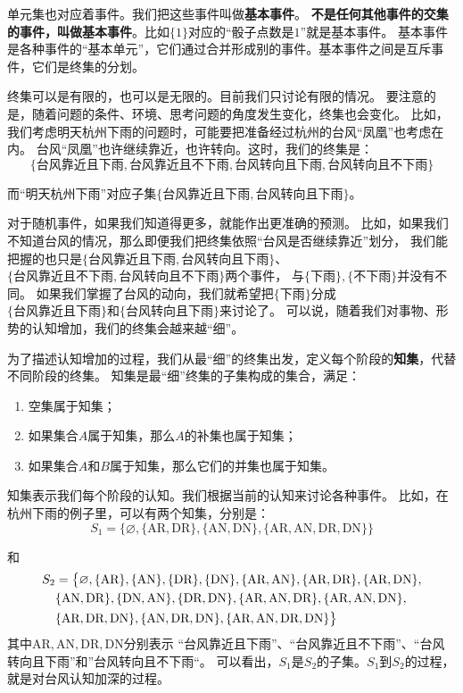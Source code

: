 \documentclass[12pt,UTF8]{ctexbook}
\begin{document}
单元集也对应着事件。我们把这些事件叫做\textbf{基本事件}。
\textbf{不是任何其他事件的交集的事件，叫做基本事件}。比如$\{1\}$对应的“骰子点数是$1$”就是基本事件。
基本事件是各种事件的“基本单元”，它们通过合并形成别的事件。基本事件之间是互斥事件，它们是终集的分划。

终集可以是有限的，也可以是无限的。目前我们只讨论有限的情况。
要注意的是，随着问题的条件、环境、思考问题的角度发生变化，终集也会变化。
比如，我们考虑明天杭州下雨的问题时，可能要把准备经过杭州的台风“凤凰”也考虑在内。
台风“凤凰”也许继续靠近，也许转向。这时，我们的终集是：
$$\{\mbox{台风靠近且下雨}, \mbox{台风靠近且不下雨}, \mbox{台风转向且下雨}, \mbox{台风转向且不下雨}\}$$

而“明天杭州下雨”对应子集$\{\mbox{台风靠近且下雨}, \mbox{台风转向且下雨}\}$。

对于随机事件，如果我们知道得更多，就能作出更准确的预测。
比如，如果我们不知道台风的情况，那么即便我们把终集依照“台风是否继续靠近”划分，
我们能把握的也只是$\{\mbox{台风靠近且下雨}, \mbox{台风转向且下雨}\}$、
$\{\mbox{台风靠近且不下雨}, \mbox{台风转向且不下雨}\}$两个事件，
与$\{\mbox{下雨}\}, \{\mbox{不下雨}\}$并没有不同。
如果我们掌握了台风的动向，我们就希望把$\{\mbox{下雨}\}$分成\\   
$\{\mbox{台风靠近且下雨}\}$和$\{\mbox{台风转向且下雨}\}$来讨论了。
可以说，随着我们对事物、形势的认知增加，我们的终集会越来越“细”。

为了描述认知增加的过程，我们从最“细”的终集出发，定义每个阶段的\textbf{知集}，代替不同阶段的终集。
知集是最“细”终集的子集构成的集合，满足：

\begin{enumerate}
    \item 空集属于知集；
    \item 如果集合$A$属于知集，那么$A$的补集也属于知集；
    \item 如果集合$A$和$B$属于知集，那么它们的并集也属于知集。
\end{enumerate}

知集表示我们每个阶段的认知。我们根据当前的认知来讨论各种事件。
比如，在杭州下雨的例子里，可以有两个知集，分别是：
$$ S_1 = \big\{\varnothing, \{\mbox{AR}, \mbox{DR}\},\{\mbox{AN}, \mbox{DN}\}, \{\mbox{AR}, \mbox{AN}, \mbox{DR}, \mbox{DN}\} \big\}$$

和
\begin{align}
    S_2 &= \big\{ \varnothing, \{\mbox{AR}\}, \{\mbox{AN}\}, \{\mbox{DR}\}, \{\mbox{DN}\}, \{\mbox{AR}, \mbox{AN}\}, \{\mbox{AR}, \mbox{DR}\}, \{\mbox{AR}, \mbox{DN}\}, \notag \\
    & \{\mbox{AN}, \mbox{DR}\}, \{\mbox{DN}, \mbox{AN}\}, \{\mbox{DR}, \mbox{DN}\},  \{\mbox{AR}, \mbox{AN}, \mbox{DR}\}, \{\mbox{AR}, \mbox{AN}, \mbox{DN}\}, \notag \\
    &  \{\mbox{AR}, \mbox{DR}, \mbox{DN}\},  \{\mbox{AN}, \mbox{DR}, \mbox{DN}\}, \{\mbox{AR}, \mbox{AN}, \mbox{DR}, \mbox{DN}\} \big\} \notag 
\end{align}
其中$\mbox{AR}, \mbox{AN}, \mbox{DR}, \mbox{DN}$分别表示
“台风靠近且下雨”、“台风靠近且不下雨”、“台风转向且下雨”和”台风转向且不下雨“。
可以看出，$S_1$是$S_2$的子集。$S_1$到$S_2$的过程，就是对台风认知加深的过程。
\end{document}
